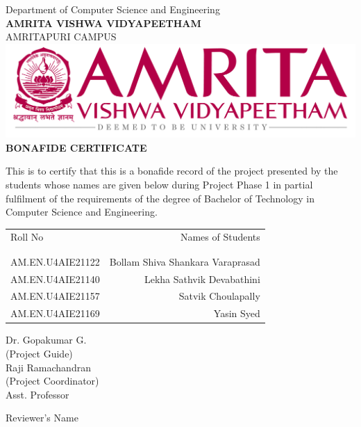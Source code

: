 \documentclass[a4paper, 12pt]{report}
\theoremstyle{definition}
\begin{document}
	\newpage
	\begin{center}
		
		{\large Department of Computer Science and Engineering}\\
		\Large{ \textbf{AMRITA VISHWA VIDYAPEETHAM}}\\
			{\large AMRITAPURI CAMPUS}\\
		\vspace*{2.2cm}
		\includegraphics[scale=0.5]{univa.png}\\
		\vspace*{1.5cm}
		{\Large \textbf{BONAFIDE CERTIFICATE}}
	\end{center}
	\vspace*{.8cm}
	This is to certify that this is a bonafide record of the project presented by the students whose names are given below during Project Phase 1 in partial fulfilment of the requirements of the degree of Bachelor of Technology in Computer Science and Engineering.\\[1.0cm]

\begin{table}[h]
\centering
\begin{tabular}{lr}
Roll No & Names of Students \\ \\ \hline
\\
AM.EN.U4AIE21122 & Bollam Shiva Shankara Varaprasad \\
AM.EN.U4AIE21140 & Lekha Sathvik Devabathini \\
AM.EN.U4AIE21157 & Satvik Choulapally \\ 
AM.EN.U4AIE21169 & Yasin Syed \\  
\end{tabular}
\end{table}



\begin{flushleft}
  Dr. Gopakumar G.\\
(Project Guide)\\  [1cm]

 Raji Ramachandran\\
(Project Coordinator)\\
Asst. Professor\\
\end{flushleft}
\begin{flushright}
Reviewer's Name\\
\end{flushright}
\end{document}
